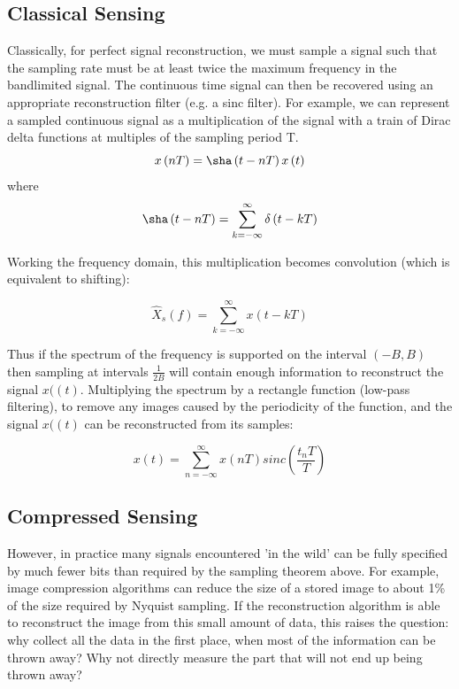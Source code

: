 \documentclass[12pt, a4paper]{article}
\begin{document}
\subsection{Classical Sensing}
Classically, for perfect signal reconstruction, we must sample a signal such that the sampling rate must be at least twice the maximum frequency in the bandlimited signal. The continuous time signal can then be recovered using an appropriate reconstruction filter (e.g. a sinc filter). For example, we can represent a sampled continuous signal as a multiplication of the signal with a train of Dirac delta functions at multiples of the sampling period T.
%
\begin{equation}
x\left(nT\right) = \sha\left(t-nT\right)x\left(t\right)
\end{equation}
%
where
%
\begin{equation}
\sha\left(t-nT\right) = \sum_{k=-\infty}^{\infty} \delta\left(t - kT\right)
\end{equation}

Working the frequency domain, this multiplication becomes convolution (which is equivalent to shifting):

\begin{equation}
\hat{X}_{s}\left(f\right) = \sum_{k=-\infty}^\infty x\left(t - kT\right)
\end{equation}

Thus if the spectrum of the frequency is supported on the interval \(\left(-B, B\right)\) then sampling at intervals \(\frac{1}{2B}\) will contain enough information to reconstruct the signal \(x(\left(t\right)\). Multiplying the spectrum by a rectangle function (low-pass filtering), to remove any images caused by the periodicity of the function, and the signal \(x(\left(t\right)\) can be reconstructed from its samples:

\begin{equation}
x\left(t\right) = \sum_{n=-\infty}^\infty x\left(nT\right) sinc\left(\frac{t_nT}{T}\right)
\end{equation}

\subsection{Compressed Sensing}

However, in practice many signals encountered 'in the wild' can be fully specified by much fewer bits than required by the sampling theorem above. For example, image compression algorithms can reduce the size of a stored image to about 1\% of the size required by Nyquist sampling. If the reconstruction algorithm is able to reconstruct the image from this small amount of data, this raises the question: why collect all the data in the first place, when most of the information can be thrown away? Why not directly measure the part that will not end up being thrown away?
\end{document}
